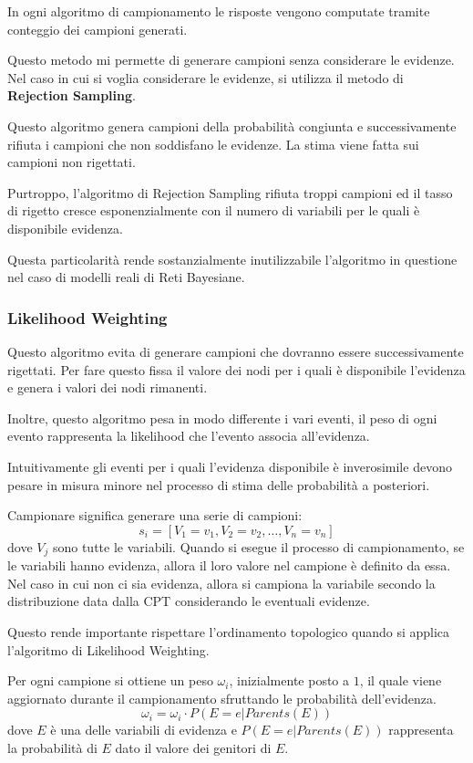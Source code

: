In ogni algoritmo di campionamento le risposte vengono computate tramite conteggio
dei campioni generati.

Questo metodo mi permette di generare campioni senza considerare le evidenze. Nel
caso in cui si voglia considerare le evidenze, si utilizza il metodo di \textbf{Rejection
    Sampling}.

Questo algoritmo genera campioni della probabilità congiunta e successivamente
rifiuta i campioni che non soddisfano le evidenze. La stima viene fatta sui
campioni non rigettati.

Purtroppo, l'algoritmo di Rejection Sampling rifiuta troppi campioni ed il tasso
di rigetto cresce esponenzialmente con il numero di variabili per le quali è
disponibile evidenza.

Questa particolarità rende sostanzialmente inutilizzabile l'algoritmo in questione
nel caso di modelli reali di Reti Bayesiane.
\subsubsection{Likelihood Weighting}
Questo algoritmo evita di generare campioni che dovranno essere successivamente
rigettati. Per fare questo fissa il valore dei nodi per i quali è disponibile
l'evidenza e genera i valori dei nodi rimanenti.

Inoltre, questo algoritmo pesa in modo differente i vari eventi, il peso di ogni
evento rappresenta la likelihood che l'evento associa all'evidenza.

Intuitivamente gli eventi per i quali l'evidenza disponibile è inverosimile devono
pesare in misura minore nel processo di stima delle probabilità a posteriori.

Campionare significa generare una serie di campioni:
\begin{equation*}
    s_i = \left[V_1=v_1, V_2= v_2, \dots, V_n=v_n\right]
\end{equation*}
dove $V_j$ sono tutte le variabili. Quando si esegue il processo di campionamento,
se le variabili hanno evidenza, allora il loro valore nel campione è definito da essa.
Nel caso in cui non ci sia evidenza, allora si campiona la variabile secondo la
distribuzione data dalla CPT considerando le eventuali evidenze.

Questo rende importante rispettare l'ordinamento topologico quando si applica
l'algoritmo di Likelihood Weighting.

Per ogni campione si ottiene un peso $\omega_i$, inizialmente posto a $1$, il
quale viene aggiornato durante il campionamento sfruttando le probabilità dell'evidenza.
\begin{equation*}
    \omega_i = \omega_i \cdot P(E = e | Parents(E))
\end{equation*}
dove $E$ è una delle variabili di evidenza e $P(E=e | Parents(E))$ rappresenta la
probabilità di $E$ dato il valore dei genitori di $E$.

